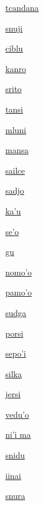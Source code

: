 {\hyperlink{val:tcandana}{tcandana}}{}{}{}

{\hyperlink{val:snuji}{snuji}}{}{}{}

{\hyperlink{val:ciblu}{ciblu}}{}{}{}

{\hyperlink{val:kanro}{kanro}}{}{}{}

{\hyperlink{val:srito}{srito}}{}{}{}

{\hyperlink{val:tansi}{tansi}}{}{}{}

{\hyperlink{val:mluni}{mluni}}{}{}{}

{\hyperlink{val:mansa}{mansa}}{}{}{}

{\hyperlink{val:sailce}{sailce}}{}{}{}

{\hyperlink{val:sadjo}{sadjo}}{}{}{}

{\hyperlink{val:kahu}{ka'u}}{}{}{}

{\hyperlink{val:seho}{se'o}}{}{}{}

{\hyperlink{val:gu}{gu}}{}{}{}

{\hyperlink{val:nomoho}{nomo'o}}{}{}{}

{\hyperlink{val:pamoho}{pamo'o}}{}{}{}

{\hyperlink{val:sudga}{sudga}}{}{}{}

{\hyperlink{val:porsi}{porsi}}{}{}{}

{\hyperlink{val:sepohi}{sepo'i}}{}{}{}

{\hyperlink{val:silka}{silka}}{}{}{}

{\hyperlink{val:jersi}{jersi}}{}{}{}

{\hyperlink{val:veduho}{vedu'o}}{}{}{}

{\hyperlink{val:nihi ma}{ni'i ma}}{}{}{}

{\hyperlink{val:snidu}{snidu}}{}{}{}

{\hyperlink{val:iinai}{iinai}}{}{}{}

{\hyperlink{val:snura}{snura}}{}{}{}

